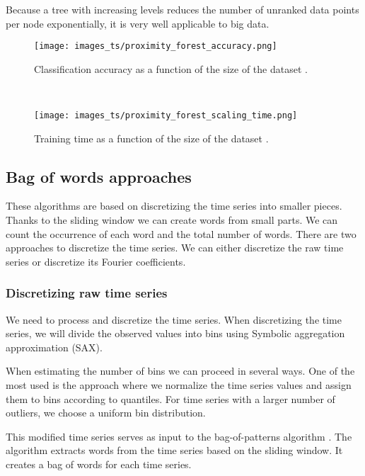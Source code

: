\documentclass[thesis=M,english]{FITthesis}[2019/12/23]
\begin{document}
Because a tree with increasing levels reduces the number of unranked data points per node exponentially, it is very well applicable to big data.

\begin{figure*}[ht!]
    \centering
    \begin{subfigure}[t]{0.5\textwidth}
        \centering
        \texttt{[image: images\_ts/proximity\_forest\_accuracy.png]}
        \caption{Classification accuracy as a function of the size of the dataset \cite{proximity_forest}.}
    \end{subfigure}%
    ~ 
    \begin{subfigure}[t]{0.5\textwidth}
        \centering
        \texttt{[image: images\_ts/proximity\_forest\_scaling\_time.png]}
        \caption{Training time as a function of the size of the dataset \cite{proximity_forest}.}
    \end{subfigure}
\end{figure*}

\newpage
\subsection{Bag of words approaches}
These algorithms are based on discretizing the time series into smaller pieces. Thanks to the sliding window we can create words from small parts. We can count the occurrence of each word and the total number of words.
There are two approaches to discretize the time series. We can either discretize the raw time series or discretize its Fourier coefficients.

\subsubsection{Discretizing raw time series}

We need to process and discretize the time series. When discretizing the time series, we will divide the observed values into bins using \cite{SAX_VSM} Symbolic aggregation approximation (SAX). 

When estimating the number of bins we can proceed in several ways. One of the most used is the approach where we normalize the time series values and assign them to bins according to quantiles.
For time series with a larger number of outliers, we choose a uniform bin distribution.

This modified time series serves as input to the bag-of-patterns algorithm \cite{bag_of_patterns}. 
The algorithm extracts words from the time series based on the sliding window. It creates a bag of words for each time series. 
\end{document}
